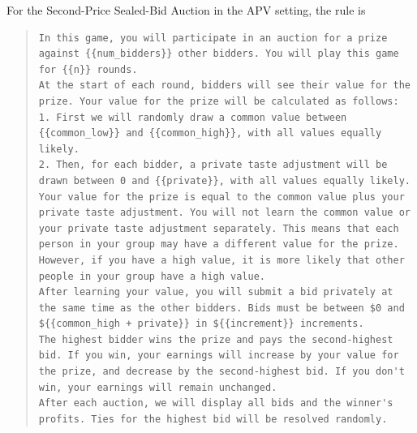 \documentclass{article} %
\begin{document}
For the Second-Price Sealed-Bid Auction in the APV setting, the rule is
\begin{quote}
\begin{lstlisting}[basicstyle=\ttfamily, breaklines=true]
In this game, you will participate in an auction for a prize against {{num_bidders}} other bidders. You will play this game for {{n}} rounds.
At the start of each round, bidders will see their value for the prize. Your value for the prize will be calculated as follows:
1. First we will randomly draw a common value between {{common_low}} and {{common_high}}, with all values equally likely.
2. Then, for each bidder, a private taste adjustment will be drawn between 0 and {{private}}, with all values equally likely.
Your value for the prize is equal to the common value plus your private taste adjustment. You will not learn the common value or your private taste adjustment separately. This means that each person in your group may have a different value for the prize. However, if you have a high value, it is more likely that other people in your group have a high value.
After learning your value, you will submit a bid privately at the same time as the other bidders. Bids must be between $0 and ${{common_high + private}} in ${{increment}} increments. 
The highest bidder wins the prize and pays the second-highest bid. If you win, your earnings will increase by your value for the prize, and decrease by the second-highest bid. If you don't win, your earnings will remain unchanged.
After each auction, we will display all bids and the winner's profits. Ties for the highest bid will be resolved randomly.\end{lstlisting}
\end{quote}
\end{document}

